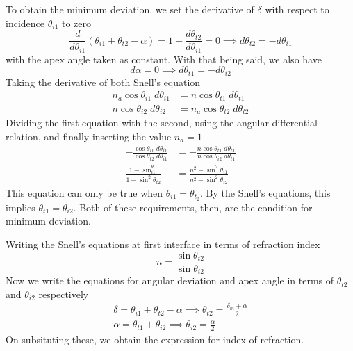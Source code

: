 \documentclass[../../../main.tex]{subfiles}
\begin{document}
To obtain the minimum deviation, we set the derivative of $\delta$ with respect to incidence $\theta_{i1}$ to zero 
\begin{equation*}
    \frac{d}{d\theta_{i1}}(\theta_{i1}+\theta_{t2}-\alpha)=1+\frac{d\theta_{t2}}{d\theta_{i1}}=0\implies d\theta_{t2}=-d\theta_{i1}
\end{equation*}
with the apex angle taken as constant. With that being said, we also have 
\begin{equation*}
    d\alpha=0\implies d\theta_{t1}=-d\theta_{i2}
\end{equation*}
Taking the derivative of both Snell's equation
\begin{align*}
    n_a\cos \theta_{i1}\;d\theta_{i1}&=n\cos \theta_{t1}\;d\theta_{t1}\\
    n\cos\theta_{i2}\;d\theta_{i2}&=n_a\cos \theta_{t2}\;d\theta_{t2}
\end{align*}
Dividing the first equation with the second, using the angular differential relation, and finally inserting the value $n_a=1$
\begin{align*}
    -\frac{\cos \theta_{i1}\;d\theta_{i1}}{\cos \theta_{t2}\;d\theta_{i1}} &=-\frac{n \cos \theta_{t1}\;d\theta_{t1}}{n  \cos\theta_{i2}\;d\theta_{t1}}\\
    \frac{1-\sin^\theta_{i1}}{1-\sin^2\theta_{t2}}&=\frac{n^2-\sin^2\theta_{i1}}{n^2-\sin^2\theta_{t2}}
\end{align*}
This equation can only be true when $\theta_{i1}=\theta_{t_2}$. By the Snell's equations, this implies $\theta_{t1}=\theta_{i2}$. Both of these requirements, then, are the condition for minimum deviation.

Writing the Snell's equations at first interface in terms of refraction index
\begin{equation*}
    n=\frac{\sin \theta_{t2}}{\sin \theta_{i2}}
\end{equation*}
Now we write the equations for angular deviation and apex angle in terms of $\theta_{t2}$ and $\theta_{i2}$ respectively 
\begin{align*}
    \delta=\theta_{i1}+\theta_{t2}-\alpha\implies \theta_{t2}=\frac{\delta_m+\alpha}{2}\\
    \alpha=\theta_{t1}+\theta_{i2}\implies \theta_{i2}=\frac{\alpha}{2}
\end{align*}
On subsituting these, we obtain the expression for index of refraction. 
\end{document}
